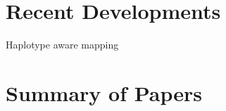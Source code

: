 \section{Recent Developments}
Haplotype aware mapping 
\section{Summary of Papers}
% 
% 
% 
% 
% 
% 
\clearpage
% 

